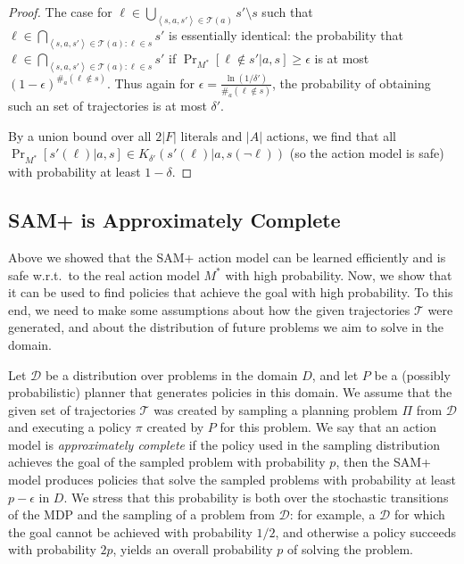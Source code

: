 \documentclass[letterpaper]{article} %
\newcommand{\tuple}[1]{\ensuremath{\left \langle #1 \right \rangle }}
\begin{document}
\begin{proof}
The case for $\ell \in \bigcup_{\tuple{s, a, s'}\in \mathcal{T}(a)} s'\setminus s$ such that $\ell \in \bigcap_{\tuple{s, a, s'}\in \mathcal{T}(a):\ell\in s}s'$ is essentially identical: the probability that $\ell \in \bigcap_{\tuple{s, a, s'}\in \mathcal{T}(a):\ell\in s}s'$ if $\Pr_{M^*}[\ell\notin s'|a,s]\geq \epsilon$ is at most $(1-\epsilon)^{\#_a(\ell\notin s)}$. Thus again for $\epsilon = \frac{\ln(1/\delta')}{\#_a(\ell\notin s)}$, the probability of obtaining such an set of trajectories is at most $\delta'$.

By a union bound over all $2|F|$ literals and $|A|$ actions, we find that all $\Pr_{M^*}[s'(\ell)|a,s]\in K_{\delta'}(s'(\ell)|a,s(\neg\ell))$ (so the action model is safe) with probability at least $1-\delta$. %
\end{proof}


\subsection{SAM+ is Approximately Complete}

Above we showed that the SAM+ action model can be learned efficiently and is safe w.r.t.\ to the real action model $M^*$ with high probability. 
Now, we show that it can be used to find policies that achieve the goal with high probability. 
To this end, we need to make some assumptions about how the given trajectories $\mathcal{T}$ were generated, and about the distribution of future problems we aim to solve in the domain. 


Let $\mathcal{D}$ be a distribution over problems in the domain $D$, 
and let $P$ be a (possibly probabilistic) planner that generates policies in this domain. 
We assume that the given set of trajectories $\mathcal{T}$ was created by sampling a planning problem $\Pi$ from $\mathcal{D}$ and executing a policy $\pi$ created by $P$ for this problem. %
We say that an action model is \emph{approximately complete} if the policy used in the sampling distribution achieves the goal of the sampled problem with probability $p$, then the SAM+ model produces policies that solve the sampled problems with probability at least $p-\epsilon$ in $D$.
We stress that this probability is both over the stochastic transitions of the MDP and the sampling of a problem from $\mathcal{D}$: for example, a $\mathcal{D}$ for which the goal cannot be achieved with probability $1/2$, and otherwise a policy succeeds with probability $2p$, yields an overall probability $p$ of solving the problem.
\end{document}

